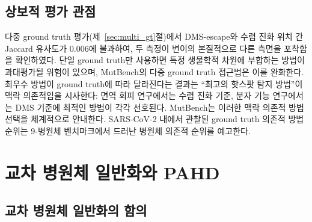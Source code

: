 \subsection{상보적 평가 관점}
\label{sec:complementary_gt}

다중 ground truth 평가(제~\ref{sec:multi_gt}절)에서 DMS-escape와 수렴 진화 위치 간 Jaccard 유사도가 0.006에 불과하여, 두 측정이 변이의 본질적으로 다른 측면을 포착함을 확인하였다.
단일 ground truth만 사용하면 특정 생물학적 차원에 부합하는 방법이 과대평가될 위험이 있으며, MutBench의 다중 ground truth 접근법은 이를 완화한다.
최우수 방법이 ground truth에 따라 달라진다는 결과는 ``최고의 핫스팟 탐지 방법''이 맥락 의존적임을 시사한다: 면역 회피 연구에서는 수렴 진화 기준, 분자 기능 연구에서는 DMS 기준에 최적인 방법이 각각 선호된다.
MutBench는 이러한 맥락 의존적 방법 선택을 체계적으로 안내한다.
SARS-CoV-2 내에서 관찰된 ground truth 의존적 방법 순위는 9-병원체 벤치마크에서 드러난 병원체 의존적 순위를 예고한다.

\section{교차 병원체 일반화와 PAHD}

\subsection{교차 병원체 일반화의 함의}
\label{sec:cross_pathogen_implications}


